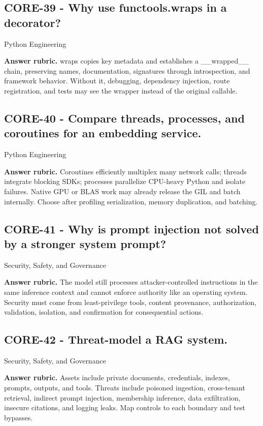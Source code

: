 \subsection*{CORE-39 - Why use functools.wraps in a decorator?}
 \quad Python Engineering
\par\smallskip\textbf{Answer rubric.} wraps copies key metadata and establishes a \_\_wrapped\_\_ chain, preserving names, documentation, signatures through introspection, and framework behavior. Without it, debugging, dependency injection, route registration, and tests may see the wrapper instead of the original callable.
\subsection*{CORE-40 - Compare threads, processes, and coroutines for an embedding service.}
 \quad Python Engineering
\par\smallskip\textbf{Answer rubric.} Coroutines efficiently multiplex many network calls; threads integrate blocking SDKs; processes parallelize CPU-heavy Python and isolate failures. Native GPU or BLAS work may already release the GIL and batch internally. Choose after profiling serialization, memory duplication, and batching.
\subsection*{CORE-41 - Why is prompt injection not solved by a stronger system prompt?}
 \quad Security, Safety, and Governance
\par\smallskip\textbf{Answer rubric.} The model still processes attacker-controlled instructions in the same inference context and cannot enforce authority like an operating system. Security must come from least-privilege tools, content provenance, authorization, validation, isolation, and confirmation for consequential actions.
\subsection*{CORE-42 - Threat-model a RAG system.}
 \quad Security, Safety, and Governance
\par\smallskip\textbf{Answer rubric.} Assets include private documents, credentials, indexes, prompts, outputs, and tools. Threats include poisoned ingestion, cross-tenant retrieval, indirect prompt injection, membership inference, data exfiltration, insecure citations, and logging leaks. Map controls to each boundary and test bypasses.
